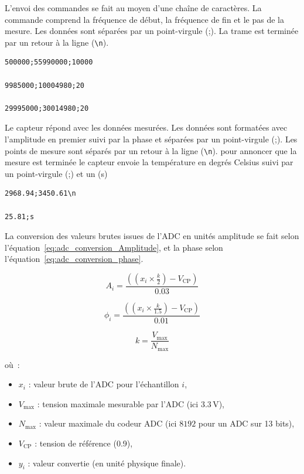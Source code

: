 L’envoi des commandes se fait au moyen d’une chaîne de caractères. La commande comprend la fréquence de début, la fréquence de fin et le pas de la mesure. Les données sont séparées par un point-virgule (;). La trame est terminée par un retour à la ligne (\texttt{\textbackslash n}).
\begin{verbatim}
500000;55990000;10000

9985000;10004980;20

29995000;30014980;20
\end{verbatim}
Le capteur répond avec les données mesurées. Les données sont formatées avec l'amplitude en premier suivi par la phase et séparées par un point-virgule (;). Les points de mesure sont séparés par un retour à la ligne (\texttt{\textbackslash n}).
pour annoncer que la mesure est terminée le capteur envoie la température en degrés Celsius suivi par un point-virgule (;) et un (s)

\begin{verbatim}
2968.94;3450.61\n

25.81;s
\end{verbatim}

La conversion des valeurs brutes issues de l'ADC en unités amplitude se fait selon l'équation~\ref{eq:adc_conversion_Amplitude}, et la phase selon l'équation~\ref{eq:adc_conversion_phase}.

\begin{equation}
A_i = \frac{\left( \left( x_i \times \frac{k}{2} \right) - V_{\text{CP}} \right)}{0.03}
\label{eq:adc_conversion_Amplitude}
\end{equation}

\begin{equation}
\phi_i = \frac{\left( \left( x_i \times \frac{k}{1.5} \right) - V_{\text{CP}} \right)}{0.01}
\label{eq:adc_conversion_phase}
\end{equation}

\begin{equation}
k = \frac{V_{\text{max}}}{N_{\text{max}}}
\label{eq:adc_conversion}
\end{equation}

où :
\begin{itemize}
    \item $x_i$ : valeur brute de l'ADC pour l'échantillon $i$,
    \item $V_{\text{max}}$ : tension maximale mesurable par l'ADC (ici $3.3\,\mathrm{V}$),
    \item $N_{\text{max}}$ : valeur maximale du codeur ADC (ici $8192$ pour un ADC sur 13 bits),
    \item $V_{\text{CP}}$ : tension de référence (0.9),
    \item $y_i$ : valeur convertie (en unité physique finale).
\end{itemize}

